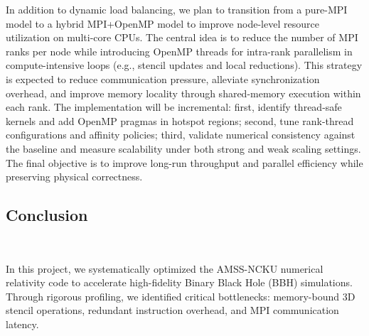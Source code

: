 In addition to dynamic load balancing, we plan to transition from a pure-MPI model to a hybrid MPI+OpenMP model to improve node-level
resource utilization on multi-core CPUs. The central idea is to reduce the number of MPI ranks per
node while introducing OpenMP threads for intra-rank parallelism in compute-intensive loops
(e.g., stencil updates and local reductions). This strategy is expected to reduce communication
pressure, alleviate synchronization overhead, and improve memory locality through shared-memory
execution within each rank.
The implementation will be incremental: first, identify thread-safe kernels and add OpenMP pragmas in hotspot regions; second, tune rank-thread configurations and affinity policies; third, validate
numerical consistency against the baseline and measure scalability under both strong and weak
scaling settings. The final objective is to improve long-run throughput and parallel efficiency while
preserving physical correctness.




\subsection{Conclusion}
\ 




In this project, we systematically optimized the AMSS-NCKU numerical relativity code to accelerate high-fidelity Binary Black Hole (BBH) simulations. 
Through rigorous profiling, we identified critical bottlenecks: memory-bound 3D stencil operations, redundant instruction overhead, and MPI communication latency.

